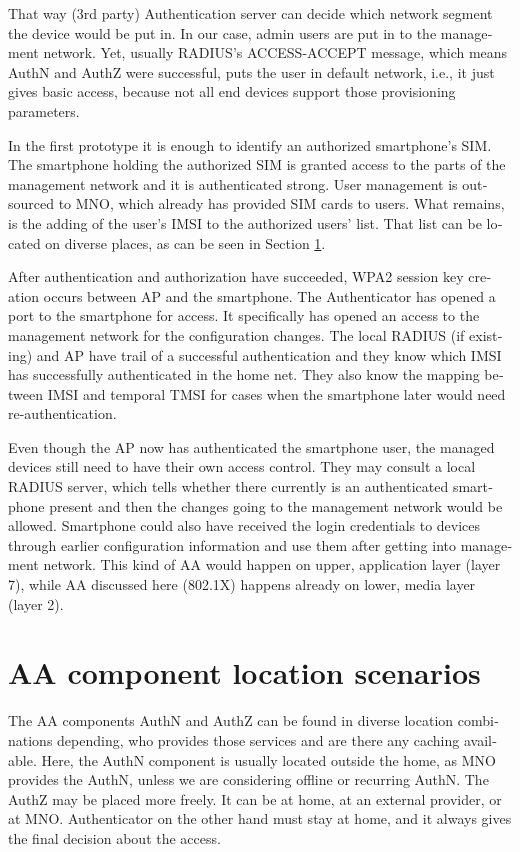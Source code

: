 \documentclass[12pt,a4paper,english]{tutthesis}
\begin{document}
\begin{otherlanguage}{english}
That way (3rd party) Authentication server can decide which network
segment the device would be put in.  In our case, admin users are put in
to the management network.  Yet, usually RADIUS's ACCESS-ACCEPT message,
which means AuthN and AuthZ were successful,  puts the user in
default network, i.e., it just gives basic access, because 
not all end devices support those provisioning parameters.

In the first prototype it is enough to identify an authorized
smartphone's SIM.  The smartphone holding the authorized SIM is granted access to
the parts of the management network and it is authenticated strong.  User
management is outsourced to MNO, which
already has provided SIM cards to users. What remains, is the adding
of the user's IMSI to the authorized users' list. That list can be
located on diverse places, as can be seen in Section \ref{sec-4-2}.


After authentication and authorization have succeeded, WPA2 session key
creation occurs between AP and the smartphone. 
The Authenticator has opened a port to the smartphone for
access. It specifically has opened an access to the management network for
the configuration changes. 
The local RADIUS (if existing) and AP have trail of a successful
authentication and they know which IMSI has successfully authenticated in
the home net. They also know the mapping between IMSI and temporal TMSI for
cases when the smartphone later would need re-authentication.


Even though the AP now has authenticated the smartphone user, the managed devices still 
need to have their own access control.
They may consult a local RADIUS server, which tells whether there currently is an
authenticated smartphone present and then the changes going
to the management network would be allowed. Smartphone could also have
received the login credentials to devices through earlier 
configuration information and use them after getting into management
network. This kind of AA would happen on upper, application layer
(layer 7), while AA discussed here (802.1X) happens already on lower, media layer (layer 2).

\section{AA component location scenarios}
\label{sec-4-2}


The AA components AuthN and AuthZ can be found in diverse location
combinations
depending, who provides those services and are there any caching
available. 
Here, the AuthN component 
is usually located outside the home, as MNO provides the AuthN, unless
we are considering offline or recurring AuthN.
The AuthZ may be placed more freely. It can be at
home, at an external provider, or at MNO.
Authenticator on the other hand must stay at home, and it always 
gives the final decision about the access.


\end{otherlanguage}
\end{document}
